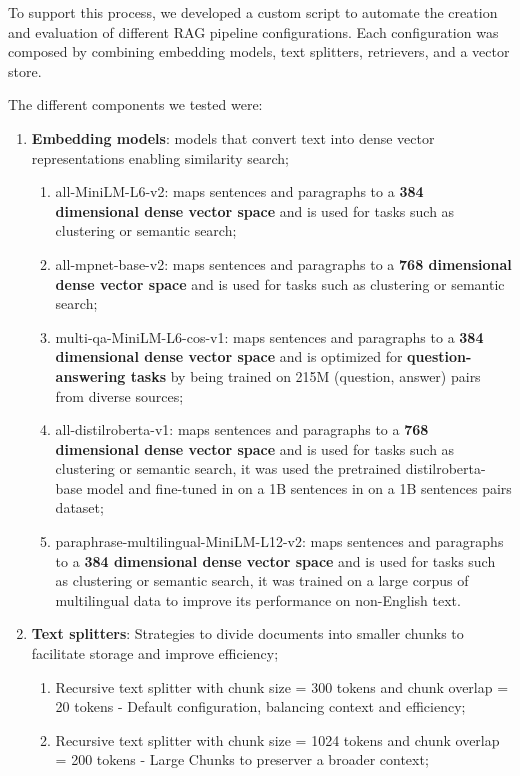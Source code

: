 To support this process, we developed a custom script to automate the creation and evaluation of different RAG pipeline configurations. Each configuration was composed by combining embedding models, text splitters, retrievers, and a vector store. 

The different components we tested were:

\begin{enumerate}
    \item \textbf{Embedding models}: models that convert text into dense vector representations enabling similarity search;
    \begin{enumerate}
        \item all-MiniLM-L6-v2: maps sentences and paragraphs to a \textbf{384 dimensional dense vector space} and is used for tasks such as clustering or semantic search;
        \item all-mpnet-base-v2: maps sentences and paragraphs to a \textbf{768 dimensional dense vector space} and is used for tasks such as clustering or semantic search;
        \item multi-qa-MiniLM-L6-cos-v1: maps sentences and paragraphs to a \textbf{384 dimensional dense vector space} and is optimized for \textbf{question-answering tasks} by being trained on 215M (question, answer) pairs from diverse sources;
        \item all-distilroberta-v1: maps sentences and paragraphs to a \textbf{768 dimensional dense vector space} and is used for tasks such as clustering or semantic search, it was used the pretrained distilroberta-base model and fine-tuned in on a 1B sentences in on a 1B sentences pairs dataset;
        \item paraphrase-multilingual-MiniLM-L12-v2: maps sentences and paragraphs to a \textbf{384 dimensional dense vector space} and is used for tasks such as clustering or semantic search, it was trained on a large corpus of multilingual data to improve its performance on non-English text.
    \end{enumerate}
    \item \textbf{Text splitters}: Strategies to divide documents into smaller chunks to facilitate storage and improve efficiency;
    \begin{enumerate}
        \item Recursive text splitter with chunk size = 300 tokens and chunk overlap = 20 tokens - Default configuration, balancing context and efficiency;
        \item Recursive text splitter with chunk size = 1024 tokens and chunk overlap = 200 tokens - Large Chunks to preserver a broader context;

\end{enumerate}
\end{enumerate}
